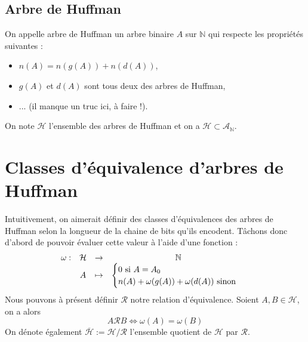 \documentclass[a4paper, 12pt]{article}
\let\iff\Longleftrightarrow
\begin{document}
\subsection{Arbre de Huffman}
On appelle arbre de Huffman un arbre binaire $A$ sur $\mathbb{N}$ qui respecte les propriétés suivantes :
\begin{itemize}
\item $n(A) = n(g(A))+n(d(A))$,
\item $g(A)$ et $d(A)$ sont tous deux des arbres de Huffman,
\item ... (il manque un truc ici, à faire !).
\end{itemize}
On note $\mathcal{H}$ l'ensemble des arbres de Huffman et on a $\mathcal{H} \subset \mathcal{A}_\mathbb{N}$.

\section{Classes d'équivalence d'arbres de Huffman}
Intuitivement, on aimerait définir des classes d'équivalences des arbres de Huffman selon la longueur de la chaine de bits qu'ils encodent. Tâchons donc d'abord de pouvoir évaluer cette valeur à l'aide d'une fonction :
$$
\begin{matrix}
\omega: &\mathcal{H} &\rightarrow &\mathbb{N} \\
&A &\mapsto &{\begin{cases}
	0 \text{ si } A = A_0 \\    
	n(A)+\omega(g(A))+\omega(d(A)) \text{ sinon}
\end{cases}}
\end{matrix} \\
$$
Nous pouvons à présent définir $\mathcal{R}$ notre relation d'équivalence. Soient $A, B \in \mathcal{H}$, on a alors
$$
A \mathcal{R} B \iff \omega(A) = \omega(B)
$$
On dénote également $\overline{\mathcal{H}} := \mathcal{H}/\mathcal{R}$ l'ensemble quotient de $\mathcal{H}$ par $\mathcal{R}$.
\end{document}
